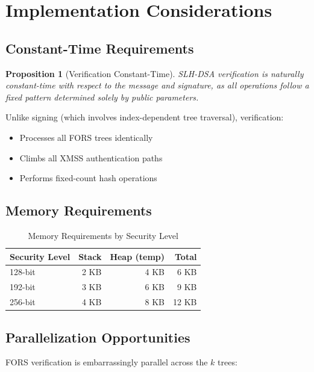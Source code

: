 \documentclass[11pt,a4paper]{article}
\newtheorem{proposition}{Proposition}
\begin{document}
\section{Implementation Considerations}

\subsection{Constant-Time Requirements}

\begin{proposition}[Verification Constant-Time]
SLH-DSA verification is naturally constant-time with respect to the message and signature, as all operations follow a fixed pattern determined solely by public parameters.
\end{proposition}

Unlike signing (which involves index-dependent tree traversal), verification:
\begin{itemize}
    \item Processes all FORS trees identically
    \item Climbs all XMSS authentication paths
    \item Performs fixed-count hash operations
\end{itemize}

\subsection{Memory Requirements}

\begin{table}[htbp]
\centering
\caption{Memory Requirements by Security Level}
\label{tab:memory}
\begin{tabular}{@{}lrrr@{}}
\toprule
Security Level & Stack & Heap (temp) & Total \\
\midrule
128-bit & 2 KB & 4 KB & 6 KB \\
192-bit & 3 KB & 6 KB & 9 KB \\
256-bit & 4 KB & 8 KB & 12 KB \\
\bottomrule
\end{tabular}
\end{table}

\subsection{Parallelization Opportunities}

FORS verification is embarrassingly parallel across the $k$ trees:
\end{document}
